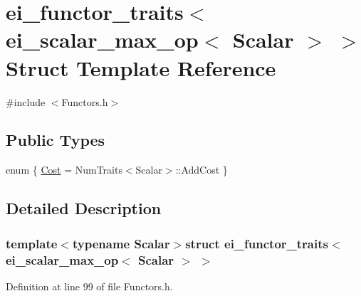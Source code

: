\hypertarget{structei__functor__traits_3_01ei__scalar__max__op_3_01_scalar_01_4_01_4}{\section{ei\-\_\-functor\-\_\-traits$<$ ei\-\_\-scalar\-\_\-max\-\_\-op$<$ Scalar $>$ $>$ Struct Template Reference}
\label{structei__functor__traits_3_01ei__scalar__max__op_3_01_scalar_01_4_01_4}
}


{\ttfamily \#include $<$Functors.\-h$>$}

\subsection*{Public Types}
\begin{DoxyCompactItemize}
\item 
enum \{ \hyperlink{structei__functor__traits_3_01ei__scalar__max__op_3_01_scalar_01_4_01_4_a70dbc2810c91a84c72d89289e14807f7a923610c19dcab0e4b35010a7603797f9}{Cost} = Num\-Traits$<$Scalar$>$\-:\-:Add\-Cost
 \}
\end{DoxyCompactItemize}


\subsection{Detailed Description}
\subsubsection*{template$<$typename Scalar$>$struct ei\-\_\-functor\-\_\-traits$<$ ei\-\_\-scalar\-\_\-max\-\_\-op$<$ Scalar $>$ $>$}



Definition at line 99 of file Functors.\-h.



